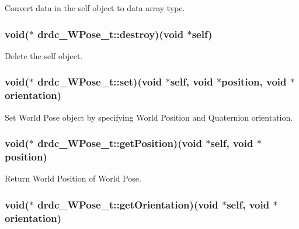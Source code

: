 Convert data in the self object to data array type. 

\hypertarget{structdrdc__WPose__t_af1d0b646c10fa92d1710608a9c884be}{
\subsubsection[destroy]{\setlength{\rightskip}{0pt plus 5cm}void($\ast$ {\bf drdc\_\-WPose\_\-t::destroy})(void $\ast$self)}}
\label{structdrdc__WPose__t_af1d0b646c10fa92d1710608a9c884be}


Delete the self object. 

\hypertarget{structdrdc__WPose__t_c92f5aeb84b2e6a64fee507c46142894}{
\subsubsection[set]{\setlength{\rightskip}{0pt plus 5cm}void($\ast$ {\bf drdc\_\-WPose\_\-t::set})(void $\ast$self, void $\ast$position, void $\ast$orientation)}}
\label{structdrdc__WPose__t_c92f5aeb84b2e6a64fee507c46142894}


Set World Pose object by specifying World Position and Quaternion orientation. 

\hypertarget{structdrdc__WPose__t_c8fe7410e2bc56d75ddf74b1eda30974}{
\subsubsection[getPosition]{\setlength{\rightskip}{0pt plus 5cm}void($\ast$ {\bf drdc\_\-WPose\_\-t::getPosition})(void $\ast$self, void $\ast$position)}}
\label{structdrdc__WPose__t_c8fe7410e2bc56d75ddf74b1eda30974}


Return World Position of World Pose. 

\hypertarget{structdrdc__WPose__t_9bf7a8f57cc6eca900b950ba2bc1591a}{
\subsubsection[getOrientation]{\setlength{\rightskip}{0pt plus 5cm}void($\ast$ {\bf drdc\_\-WPose\_\-t::getOrientation})(void $\ast$self, void $\ast$orientation)}}
\label{structdrdc__WPose__t_9bf7a8f57cc6eca900b950ba2bc1591a}


